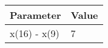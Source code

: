     \begin{tabular}{|p{3cm}|p{3cm}|}
        \hline
        \textbf{Parameter} & \textbf{Value} \\
        \hline
        x(16) - x(9) & 7  \\
        \hline
    \end{tabular}

